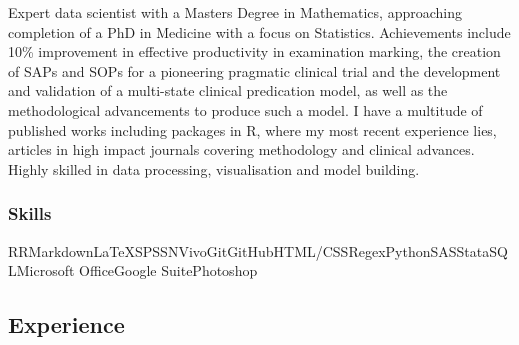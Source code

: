\documentclass[
]{article}
\begin{document}
Expert data scientist with a Masters Degree in Mathematics, approaching
completion of a PhD in Medicine with a focus on Statistics. Achievements
include 10\% improvement in effective productivity in examination
marking, the creation of SAPs and SOPs for a pioneering pragmatic
clinical trial and the development and validation of a multi-state
clinical predication model, as well as the methodological advancements
to produce such a model. I have a multitude of published works including
packages in R, where my most recent experience lies, articles in high
impact journals covering methodology and clinical advances. Highly
skilled in data processing, visualisation and model building.

\hypertarget{skills}{%
\subsubsection{Skills}\label{skills}}

R\quad RMarkdown\quad LaTeX\quad SPSS\quad NVivo\quad Git\quad GitHub\quad HTML/CSS\quad Regex\quad Python\quad SAS\quad Stata\quad SQL\quad Microsoft
Office\quad Google Suite\quad Photoshop

\newpage

\hypertarget{experience}{%
\subsection{Experience}\label{experience}}
\end{document}

